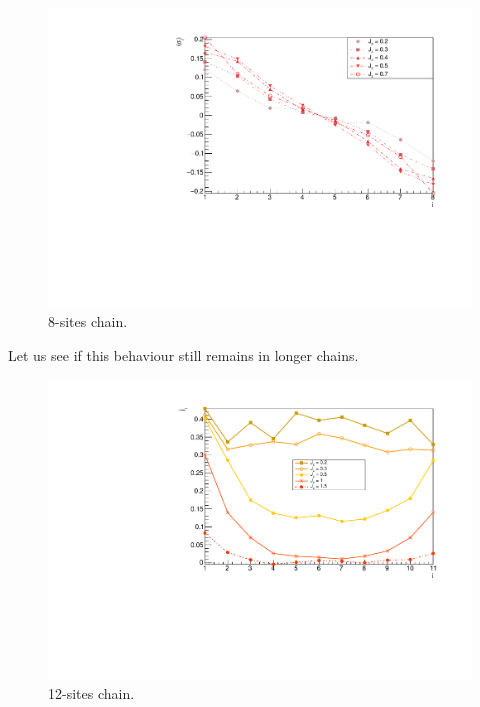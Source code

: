 \begin{figure}[H]
    \centering
    \includegraphics[scale=0.7]{Figures/8sites_LMvsLowJz.pdf}
    \caption{8-sites chain.}
    \label{fig:my_label}
\end{figure}


Let us see if this behaviour still remains in longer chains.

\begin{figure}[H]
    \centering
    \includegraphics[scale=0.7]{Figures/12sites_spinCurrVSJz.pdf}
    \caption{12-sites chain.}
    \label{fig:my_label}
\end{figure}

